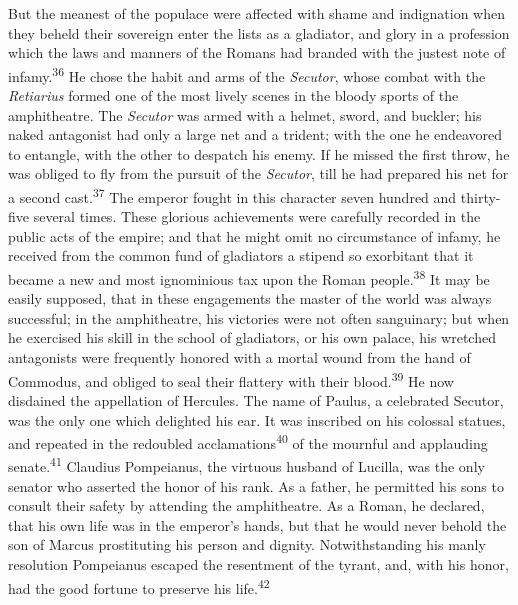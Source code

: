 
But the meanest of the populace were affected with shame and
indignation when they beheld their sovereign enter the lists as a
gladiator, and glory in a profession which the laws and manners
of the Romans had branded with the justest note of infamy.\textsuperscript{36} He
chose the habit and arms of the \textit{Secutor}, whose combat with the
\textit{Retiarius} formed one of the most lively scenes in the bloody
sports of the amphitheatre. The \textit{Secutor} was armed with a
helmet, sword, and buckler; his naked antagonist had only a large
net and a trident; with the one he endeavored to entangle, with
the other to despatch his enemy. If he missed the first throw, he
was obliged to fly from the pursuit of the \textit{Secutor}, till he had
prepared his net for a second cast.\textsuperscript{37} The emperor fought in this
character seven hundred and thirty-five several times. These
glorious achievements were carefully recorded in the public acts
of the empire; and that he might omit no circumstance of infamy,
he received from the common fund of gladiators a stipend so
exorbitant that it became a new and most ignominious tax upon the
Roman people.\textsuperscript{38} It may be easily supposed, that in these
engagements the master of the world was always successful; in the
amphitheatre, his victories were not often sanguinary; but when
he exercised his skill in the school of gladiators, or his own
palace, his wretched antagonists were frequently honored with a
mortal wound from the hand of Commodus, and obliged to seal their
flattery with their blood.\textsuperscript{39} He now disdained the appellation of
Hercules. The name of Paulus, a celebrated Secutor, was the only
one which delighted his ear. It was inscribed on his colossal
statues, and repeated in the redoubled acclamations\textsuperscript{40} of the
mournful and applauding senate.\textsuperscript{41} Claudius Pompeianus, the
virtuous husband of Lucilla, was the only senator who asserted
the honor of his rank. As a father, he permitted his sons to
consult their safety by attending the amphitheatre. As a Roman,
he declared, that his own life was in the emperor’s hands, but
that he would never behold the son of Marcus prostituting his
person and dignity. Notwithstanding his manly resolution
Pompeianus escaped the resentment of the tyrant, and, with his
honor, had the good fortune to preserve his life.\textsuperscript{42}



